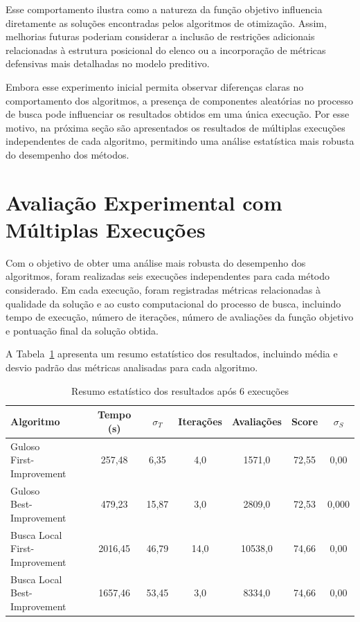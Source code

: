 Esse comportamento ilustra como a natureza da função objetivo influencia 
diretamente as soluções encontradas pelos algoritmos de otimização. Assim, melhorias futuras 
poderiam considerar a inclusão de restrições adicionais relacionadas à estrutura 
posicional do elenco ou a incorporação de métricas defensivas mais detalhadas 
no modelo preditivo.

Embora esse experimento inicial permita observar diferenças claras no comportamento 
dos algoritmos, a presença de componentes aleatórias no processo de busca 
pode influenciar os resultados obtidos em uma única execução. Por esse motivo, na 
próxima seção são apresentados os resultados de múltiplas execuções 
independentes de cada algoritmo, permitindo uma análise estatística mais robusta do 
desempenho dos métodos.

\section{Avaliação Experimental com Múltiplas Execuções}

Com o objetivo de obter uma análise mais robusta do desempenho dos algoritmos, foram 
realizadas seis execuções independentes para cada método considerado. 
Em cada execução, foram registradas métricas relacionadas à qualidade da solução e ao 
custo computacional do processo de busca, incluindo tempo de execução, 
número de iterações, número de avaliações da função objetivo e pontuação final da 
solução obtida.

A Tabela~\ref{tab:benchmark_multiplas_execucoes} apresenta um resumo estatístico 
dos resultados, incluindo média e desvio padrão das métricas analisadas 
para cada algoritmo.

\begin{table}[hbt]
\centering
\caption{Resumo estatístico dos resultados após 6 execuções}
\label{tab:benchmark_multiplas_execucoes}

\begin{tabular}{lcccccc}
\hline
Algoritmo & Tempo (s) & $\sigma_T$ & Iterações & Avaliações & Score & $\sigma_S$ \\
\hline
\makecell[l]{Guloso \\ First-Improvement} & 257,48 & 6,35 & 4,0 & 1571,0 & 72,55 & 0,00 \\[4pt]
\makecell[l]{Guloso \\ Best-Improvement} & 479,23 & 15,87 & 3,0 & 2809,0 & 72,53 & 0,000 \\[6pt]
\makecell[l]{Busca Local \\ First-Improvement} & 2016,45 & 46,79 & 14,0 & 10538,0 & 74,66 & 0,00 \\[4pt]
\makecell[l]{Busca Local \\ Best-Improvement} & 1657,46 & 53,45 & 3,0 & 8334,0 & 74,66 & 0,00 \\
\hline
\end{tabular}

\vspace{.3cm}
\end{table}

